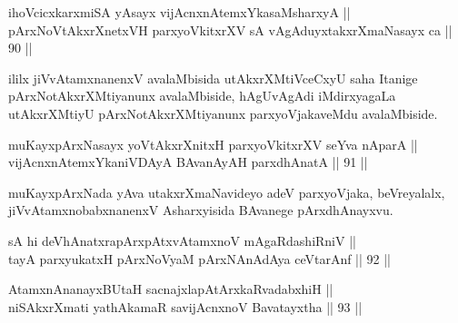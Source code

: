 \begin{shl}
ihoVcicxkarxmiSA yA\s sayx vijAcnxnAtemxYkasaMsharxyA || \\
\footnotemark[1]pArxNoVtAkxrXnetxVH parxyoVkitxrXV sA vAgAduyxtakxrXmaNasayx ca \hfill || 90 ||  
\end{shl}

\begin{artha}
ililx jiVvAtamxnanenxV avalaMbisida utAkxrXMtiVceCxyU saha Itanige
pArxNotAkxrXMtiyanunx avalaMbiside, hAgUvAgAdi iMdirxyagaLa
utAkxrXMtiyU pArxNotAkxrXMtiyanunx parxyoVjakaveMdu avalaMbiside.
\end{artha}

\begin{shl}
muKayxpArxNasayx yoVtAkxrXnitxH parxyoVkitxrXV seYva nAparA || \\
\footnotemark[2]vijAcnxnAtemxYkaniVDAyA BAvanAyAH parxdhAnatA \hfill || 91 ||  
\end{shl}

\begin{artha}
muKayxpArxNada yAva utakxrXmaNavideyo adeV parxyoVjaka, beVreyalalx,
jiVvAtamxnobabxnanenxV Asharxyisida BAvanege pArxdhAnayxvu.
\end{artha}


\begin{shl}
sA hi deVhAnatxrapArxpAtxvAtamxnoV mAgaRdashiRniV || \\
tayA parxyukatxH pArxNoV\s yaM pArxNAnAdAya ceVtarAnf \hfill || 92 ||  
\end{shl}

\begin{shl}
AtamxnA\s nanayxBUtaH sacnajxlapAtArxkaRvadabxhiH || \\
niSAkxrXmati yathAkamaR savijAcnxnoV Bavatayxtha \hfill || 93 ||  
\end{shl}

